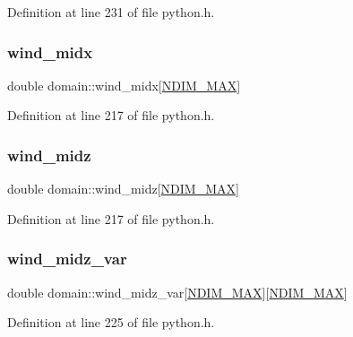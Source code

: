 Definition at line 231 of file python.\+h.

\mbox{\label{structdomain_a6b7011ab95d96a802a079bca85943ca0}} 
\subsubsection{\texorpdfstring{wind\+\_\+midx}{wind\_midx}}
{\footnotesize\ttfamily double domain\+::wind\+\_\+midx\mbox{[}\hyperlink{python_8h_a80cccc8d22c78d3095c60ab2aedeb2a5}{N\+D\+I\+M\+\_\+\+M\+AX}\mbox{]}}



Definition at line 217 of file python.\+h.

\mbox{\label{structdomain_a90e3e71591ed0419563a4a80008a84bb}} 
\subsubsection{\texorpdfstring{wind\+\_\+midz}{wind\_midz}}
{\footnotesize\ttfamily double domain\+::wind\+\_\+midz\mbox{[}\hyperlink{python_8h_a80cccc8d22c78d3095c60ab2aedeb2a5}{N\+D\+I\+M\+\_\+\+M\+AX}\mbox{]}}



Definition at line 217 of file python.\+h.

\mbox{\label{structdomain_a5d14eb35cccb6c7d3d7078901dc78b95}} 
\subsubsection{\texorpdfstring{wind\+\_\+midz\+\_\+var}{wind\_midz\_var}}
{\footnotesize\ttfamily double domain\+::wind\+\_\+midz\+\_\+var\mbox{[}\hyperlink{python_8h_a80cccc8d22c78d3095c60ab2aedeb2a5}{N\+D\+I\+M\+\_\+\+M\+AX}\mbox{]}\mbox{[}\hyperlink{python_8h_a80cccc8d22c78d3095c60ab2aedeb2a5}{N\+D\+I\+M\+\_\+\+M\+AX}\mbox{]}}



Definition at line 225 of file python.\+h.

\mbox{\label{structdomain_af420dea37ea0710d902daa217261d142}} 
